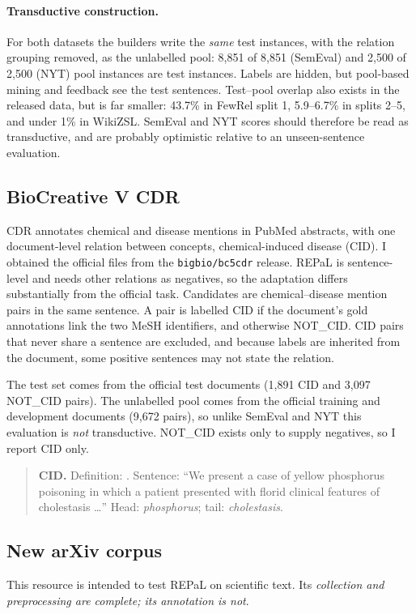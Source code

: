 \paragraph{Transductive construction.} For both datasets the builders write the \emph{same} test instances, with the relation grouping removed, as the unlabelled pool: 8,851 of 8,851 (SemEval) and 2,500 of 2,500 (NYT) pool instances are test instances. Labels are hidden, but pool-based mining and feedback see the test sentences. Test--pool overlap also exists in the released data, but is far smaller: 43.7\% in FewRel split 1, 5.9--6.7\% in splits 2--5, and under 1\% in WikiZSL. SemEval and NYT scores should therefore be read as transductive, and are probably optimistic relative to an unseen-sentence evaluation.

\subsection{BioCreative V CDR}
CDR \citep{li2016biocreative} annotates chemical and disease mentions in PubMed abstracts, with one document-level relation between concepts, chemical-induced disease (CID). I obtained the official files from the \texttt{bigbio/bc5cdr} release. REPaL is sentence-level and needs other relations as negatives, so the adaptation differs substantially from the official task. Candidates are chemical--disease mention pairs in the same sentence. A pair is labelled CID if the document's gold annotations link the two MeSH identifiers, and otherwise NOT\_CID. CID pairs that never share a sentence are excluded, and because labels are inherited from the document, some positive sentences may not state the relation.

The test set comes from the official test documents (1,891 CID and 3,097 NOT\_CID pairs). The unlabelled pool comes from the official training and development documents (9,672 pairs), so unlike SemEval and NYT this evaluation is \emph{not} transductive. NOT\_CID exists only to supply negatives, so I report CID only.

\begin{quote}\small
\textbf{CID.} Definition: .
Sentence: ``We present a case of yellow phosphorus poisoning in which a patient presented with florid clinical features of cholestasis \ldots''
Head: \emph{phosphorus}; tail: \emph{cholestasis}.
\end{quote}

\subsection{New arXiv corpus}
This resource is intended to test REPaL on scientific text. Its \emph{collection and preprocessing are complete; its annotation is not}.

